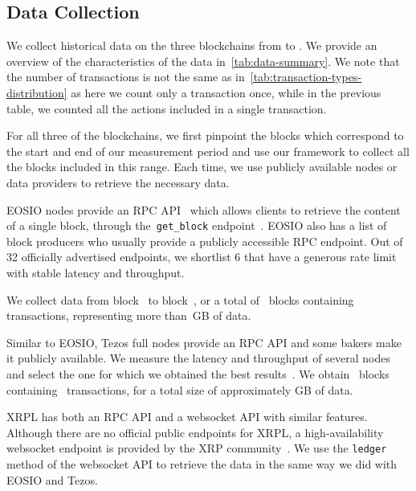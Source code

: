 \subsection{Data Collection}
We collect historical data on the three blockchains from \startdate to \finishdate.
We provide an overview of the characteristics of the data in~\autoref{tab:data-summary}.
We note that the number of transactions is not the same as in~\autoref{tab:transaction-types-distribution} as here we count only a transaction once, while in the previous table, we counted all the actions included in a single transaction.

For all three of the blockchains, we first pinpoint the blocks which correspond to the start and end of our measurement period and use our framework to collect all the blocks included in this range.
Each time, we use publicly available nodes or data providers to retrieve the necessary data.

EOSIO nodes provide an RPC API~\cite{EOS.IO2020} which allows clients to retrieve the content of a single block, through the~\texttt{get\_block} endpoint~\cite{EOSDocs2020}.
EOSIO also has a list of block producers who usually provide a publicly accessible RPC endpoint. Out of 32 officially advertised endpoints, we shortlist 6 that have a generous rate limit with stable latency and throughput.

We collect data from block~\empirical{\numprint{\EOSStartBlock}} to block~\empirical{\numprint{\EOSEndBlock}}, or a total of~\empirical{\blockscount{\EOSStartBlock}{\EOSEndBlock}} blocks containing~ transactions, representing more than~GB of data.

Similar to EOSIO, Tezos full nodes provide an RPC API and some bakers make it publicly available. We measure the latency and throughput of several nodes and select the one for which we obtained the best results~\cite{tezos-ukraine}.
We obtain~\empirical{\blockscount{\TezosStartBlock}{\TezosEndBlock}} blocks containing~ transactions, for a total size of approximately  GB of data.

XRPL has both an RPC API and a websocket API with similar features. Although there are no official public endpoints for XRPL, a high-availability websocket endpoint is provided by the XRP community~\cite{Wind2020}. We use the \texttt{ledger} method of the websocket API to retrieve the data in the same way we did with EOSIO and Tezos.

